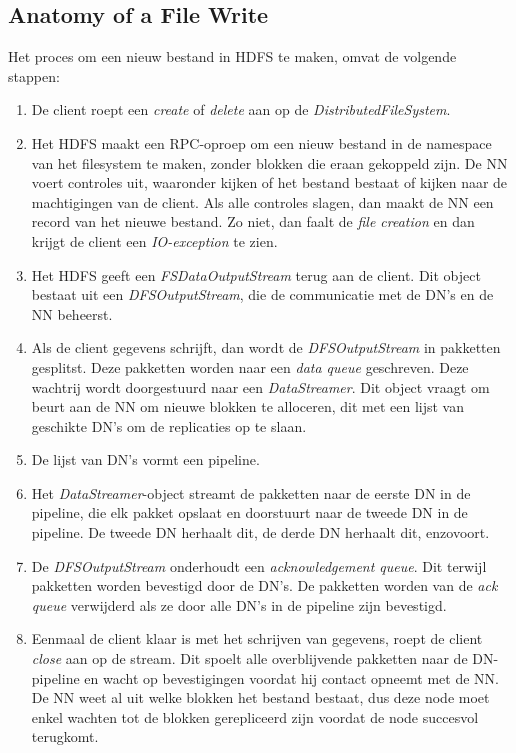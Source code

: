 \documentclass[a4paper,10pt,twoside]{report}
\begin{document}
\subsection{Anatomy of a File Write}

Het proces om een nieuw bestand in HDFS te maken, omvat de volgende stappen:

\begin{enumerate}
	\item De client roept een \textit{create} of \textit{delete} aan op de \textit{DistributedFileSystem}.
	\item Het HDFS maakt een RPC-oproep om een nieuw bestand in de namespace van het filesystem te maken, zonder blokken die eraan gekoppeld zijn. De NN voert controles uit, waaronder kijken of het bestand bestaat of kijken naar de machtigingen van de client. Als alle controles slagen, dan maakt de NN een record van het nieuwe bestand. Zo niet, dan faalt de \textit{file creation} en dan krijgt de client een \textit{IO-exception} te zien.
	\item Het HDFS geeft een \textit{FSDataOutputStream} terug aan de client. Dit object bestaat uit een \textit{DFSOutputStream}, die de communicatie met de DN's en de NN beheerst.
	\item Als de client gegevens schrijft, dan wordt de \textit{DFSOutputStream} in pakketten gesplitst. Deze pakketten worden naar een \textit{data queue} geschreven. Deze wachtrij wordt doorgestuurd naar een \textit{DataStreamer}. Dit object vraagt om beurt aan de NN om nieuwe blokken te alloceren, dit met een lijst van geschikte DN's om de replicaties op te slaan.
	\item De lijst van DN's vormt een pipeline.
	\item Het \textit{DataStreamer}-object streamt de pakketten naar de eerste DN in de pipeline, die elk pakket opslaat en doorstuurt naar de tweede DN in de pipeline. De tweede DN herhaalt dit, de derde DN herhaalt dit, enzovoort.
	\item De \textit{DFSOutputStream} onderhoudt een \textit{acknowledgement queue}. Dit terwijl pakketten worden bevestigd door de DN's. De pakketten worden van de \textit{ack queue} verwijderd als ze door alle DN's in de pipeline zijn bevestigd.
	\item Eenmaal de client klaar is met het schrijven van gegevens, roept de client \textit{close} aan op de stream. Dit spoelt alle overblijvende pakketten naar de DN-pipeline en wacht op bevestigingen voordat hij contact opneemt met de NN. De NN weet al uit welke blokken het bestand bestaat, dus deze node moet enkel wachten tot de blokken gerepliceerd zijn voordat de node succesvol terugkomt.
\end{enumerate}
\end{document}
